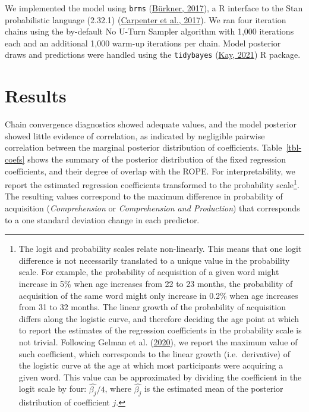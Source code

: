 \documentclass[
]{article}
\begin{document}
We implemented the model using \texttt{brms}
(\protect\hyperlink{ref-burkner2017brms}{Bürkner, 2017}), a R interface
to the Stan probabilistic language (2.32.1)
(\protect\hyperlink{ref-carpenter2017stan}{Carpenter et al., 2017}). We
ran four iteration chains using the by-default No U-Turn Sampler
algorithm with 1,000 iterations each and an additional 1,000 warm-up
iterations per chain. Model posterior draws and predictions were handled
using the \texttt{tidybayes}
(\protect\hyperlink{ref-kay2021tidybayes}{Kay, 2021}) R package.

\hypertarget{sec-results}{%
\section{Results}\label{sec-results}}

Chain convergence diagnostics showed adequate values, and the model
posterior showed little evidence of correlation, as indicated by
negligible pairwise correlation between the marginal posterior
distribution of coefficients. Table~\ref{tbl-coefs} shows the summary of
the posterior distribution of the fixed regression coefficients, and
their degree of overlap with the ROPE. For interpretability, we report
the estimated regression coefficients transformed to the probability
scale\footnote{The logit and probability scales relate non-linearly.
  This means that one logit difference is not necessarily translated to
  a unique value in the probability scale. For example, the probability
  of acquisition of a given word might increase in 5\% when age
  increases from 22 to 23 months, the probability of acquisition of the
  same word might only increase in 0.2\% when age increases from 31 to
  32 months. The linear growth of the probability of acquisition differs
  along the logistic curve, and therefore deciding the age point at
  which to report the estimates of the regression coefficients in the
  probability scale is not trivial. Following Gelman et al.
  (\protect\hyperlink{ref-gelman2020regression}{2020}), we report the
  maximum value of such coefficient, which corresponds to the linear
  growth (i.e.~derivative) of the logistic curve at the age at which
  most participants were acquiring a given word. This value can be
  approximated by dividing the coefficient in the logit scale by four:
  \(\hat{\beta_j}/4\), where \(\hat{\beta_j}\) is the estimated mean of
  the posterior distribution of coefficient \(j\).}. The resulting
values correspond to the maximum difference in probability of
acquisition (\emph{Comprehension} or \emph{Comprehension and
Production}) that corresponds to a one standard deviation change in each
predictor.
\end{document}
